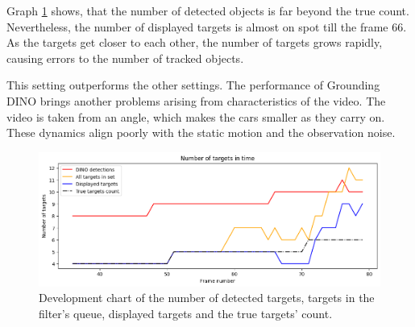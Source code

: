 Graph \ref{gr:E1-V1-S3} shows, that the number of detected objects is far beyond the true count. Nevertheless,
the number of displayed targets is almost on spot till the frame 66. As the targets get closer to each
other, the
number of targets grows rapidly, causing errors to the number of tracked objects.

This setting outperforms the other settings. The performance of Grounding DINO brings another problems arising from
characteristics of the video. The video is taken from an angle, which makes the cars smaller as they carry on. These
dynamics align poorly with the static motion and the observation noise.

\begin{figure}[H]
    \centering
    \includegraphics[width=\linewidth]{../../../experiments/E1/V1/DINO/dino_det}
    \caption{Development chart of the number of detected targets, targets in the filter's queue, displayed targets
    and the
    true
    targets' count.}
    \label{gr:E1-V1-S3}
\end{figure}

